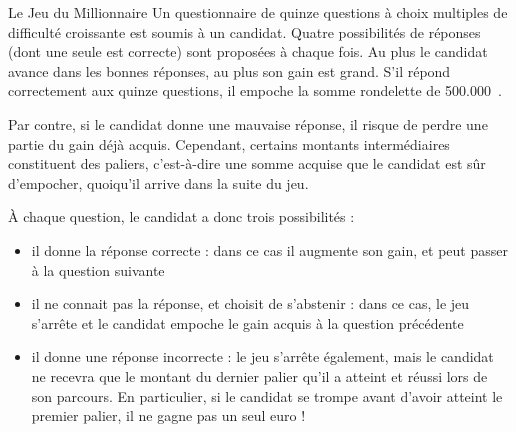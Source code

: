 \begin{Exercice}{Le Jeu du Millionnaire}
	Un questionnaire de quinze questions à choix
	multiples de difficulté croissante est soumis à un candidat. Quatre
	possibilités de réponses (dont une seule est correcte) sont proposées à
	chaque fois. Au plus le candidat avance dans les bonnes réponses, au
	plus son gain est grand. S’il répond correctement aux quinze questions,
	il empoche la somme rondelette de 500.000~\texteuro.
	
	Par contre, si le candidat donne une mauvaise
	réponse, il risque de perdre une partie du gain déjà acquis. Cependant,
	certains montants intermédiaires constituent des paliers, c’est-à-dire
	une somme acquise que le candidat est sûr d’empocher, quoiqu’il arrive
	dans la suite du jeu.

À chaque question, le candidat a donc trois
	possibilités :

	\begin{itemize}
		\item 
			il donne la réponse correcte : dans ce cas il
			augmente son gain, et peut passer à la question suivante
		\item 
			il ne connait pas la réponse, et choisit de
			s’abstenir : dans ce cas, le jeu s’arrête et le candidat empoche le
			gain acquis à la question précédente
		\item 
			il donne une réponse incorrecte : le jeu
			s’arrête également, mais le candidat ne recevra que le montant du
			dernier palier qu’il a atteint et réussi lors de son parcours. En
			particulier, si le candidat se trompe avant d’avoir atteint le premier
			palier, il ne gagne pas un seul euro !
	\end{itemize}
	

\end{Exercice}
